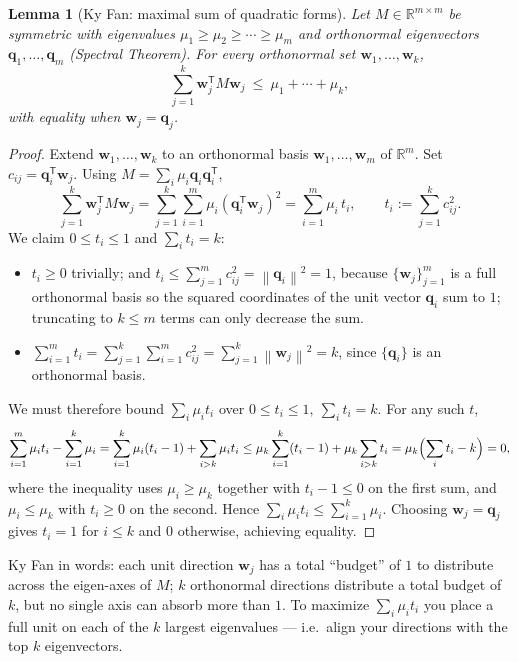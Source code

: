 \documentclass[11pt,oneside]{book}
\theoremstyle{plain}
\newtheorem{lemma}[theorem]{Lemma}
\theoremstyle{definition}
\theoremstyle{remark}
\newcommand{\R}{\mathbb{R}}
\newcommand{\norm}[1]{\left\lVert #1 \right\rVert}
\newcommand{\T}{^{\mathsf T}}
\newcommand{\bw}{\mathbf{w}}
\newcommand{\bq}{\mathbf{q}}
\begin{document}
\begin{lemma}[Ky Fan: maximal sum of quadratic forms]\label{lem:kyfan}
Let $M\in\R^{m\times m}$ be symmetric with eigenvalues
$\mu_1\ge\mu_2\ge\cdots\ge\mu_m$ and orthonormal eigenvectors $\bq_1,\dots,\bq_m$
(Spectral Theorem). For every orthonormal set $\bw_1,\dots,\bw_k$,
\[
\sum_{j=1}^k\bw_j\T M\bw_j\ \le\ \mu_1+\cdots+\mu_k,
\]
with equality when $\bw_j=\bq_j$.
\end{lemma}
\begin{proof}
Extend $\bw_1,\dots,\bw_k$ to an orthonormal basis $\bw_1,\dots,\bw_m$ of $\R^m$. Set
$c_{ij}=\bq_i\T\bw_j$. Using $M=\sum_i\mu_i\bq_i\bq_i\T$,
\[
\sum_{j=1}^k\bw_j\T M\bw_j
=\sum_{j=1}^k\sum_{i=1}^m\mu_i(\bq_i\T\bw_j)^2
=\sum_{i=1}^m\mu_i\,t_i,\qquad t_i:=\sum_{j=1}^k c_{ij}^2 .
\]
We claim $0\le t_i\le1$ and $\sum_i t_i=k$:
\begin{itemize}[leftmargin=1.5em]
\item $t_i\ge0$ trivially; and $t_i\le\sum_{j=1}^m c_{ij}^2=\norm{\bq_i}^2=1$, because
$\{\bw_j\}_{j=1}^m$ is a full orthonormal basis so the squared coordinates of the unit
vector $\bq_i$ sum to $1$; truncating to $k\le m$ terms can only decrease the sum.
\item $\sum_{i=1}^m t_i=\sum_{j=1}^k\sum_{i=1}^m c_{ij}^2=\sum_{j=1}^k\norm{\bw_j}^2=k$,
since $\{\bq_i\}$ is an orthonormal basis.
\end{itemize}
We must therefore bound $\sum_i\mu_it_i$ over $0\le t_i\le1,\ \sum_i t_i=k$. For any such
$t$,
\[
\sum_{i=1}^m\mu_it_i-\sum_{i=1}^k\mu_i
=\sum_{i=1}^k\mu_i(t_i-1)+\sum_{i>k}\mu_it_i
\le\mu_k\sum_{i=1}^k(t_i-1)+\mu_k\sum_{i>k}t_i
=\mu_k\Bigl(\sum_i t_i-k\Bigr)=0,
\]
where the inequality uses $\mu_i\ge\mu_k$ together with $t_i-1\le0$ on the first sum, and
$\mu_i\le\mu_k$ with $t_i\ge0$ on the second. Hence
$\sum_i\mu_it_i\le\sum_{i=1}^k\mu_i$. Choosing $\bw_j=\bq_j$ gives $t_i=1$ for $i\le k$
and $0$ otherwise, achieving equality.
\end{proof}

\begin{geometry_box}
Ky Fan in words: each unit direction $\bw_j$ has a total ``budget'' of $1$ to distribute
across the eigen-axes of $M$; $k$ orthonormal directions distribute a total budget of
$k$, but no single axis can absorb more than $1$. To maximize $\sum_i\mu_it_i$ you place
a full unit on each of the $k$ largest eigenvalues --- i.e.\ align your directions with
the top $k$ eigenvectors.
\end{geometry_box}
\end{document}
